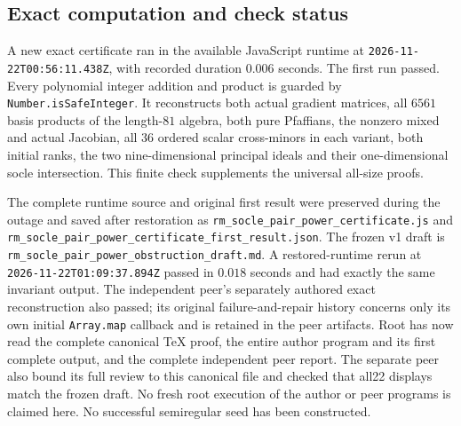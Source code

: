 \subsection{Exact computation and check status}
\label{SF-E843:checks}

A new exact certificate ran in the available JavaScript runtime at
\texttt{2026-11-22T00:56:11.438Z}, with recorded duration \(0.006\) seconds.
The first run passed.
Every polynomial integer addition and product is guarded by
\texttt{Number.isSafeInteger}.
It reconstructs both actual gradient matrices, all \(6561\) basis products
of the length-\(81\) algebra, both pure Pfaffians, the nonzero mixed
and actual Jacobian, all \(36\) ordered scalar cross-minors in each variant,
both initial ranks, the two nine-dimensional principal ideals and their
one-dimensional socle intersection.
This finite check supplements the universal all-size proofs.

The complete runtime source and original first result were preserved
during the outage and saved after restoration as
\texttt{rm\_socle\_pair\_power\_certificate.js} and
\texttt{rm\_socle\_pair\_power\_certificate\_first\_result.json}.
The frozen v1 draft is
\texttt{rm\_socle\_pair\_power\_obstruction\_draft.md}.
A restored-runtime rerun at \texttt{2026-11-22T01:09:37.894Z} passed in
\(0.018\) seconds and had exactly the same invariant output.
The independent peer's separately authored exact reconstruction also passed;
its original failure-and-repair history concerns only its own initial
\texttt{Array.map} callback and is retained in the peer artifacts.
Root has now read the complete canonical TeX proof, the entire author
program and its first complete output, and the complete independent peer
report. The separate peer also bound its full review to this canonical
file and checked that all22 displays match the frozen draft. No fresh
root execution of the author or peer programs is claimed here.
No successful semiregular seed has been constructed.
